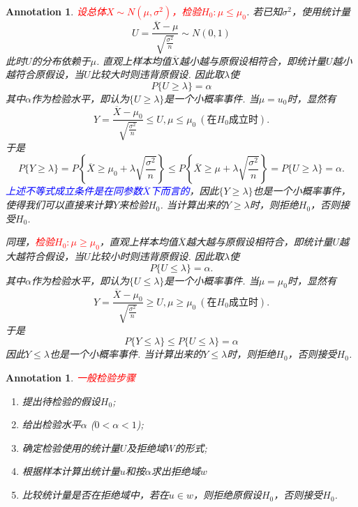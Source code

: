 \documentclass{article}
\newtheorem{annotation}[theorem]{Annotation}
\newcommand{\redt}[1]{\textcolor{red}{#1}}
\newcommand{\bluet}[1]{\textcolor{blue}{#1}}
\begin{document}
\begin{annotation}
\rm \redt{设总体$X \sim N(\mu,\sigma^2)$，检验$H_0: \mu \leq \mu_0$}. 若已知$\sigma^2$，使用统计量
$$
U = \frac{\overline{X}-\mu}{\sqrt{\frac{\sigma^2}{n}}} \sim N(0,1)
$$
此时$U$的分布依赖于$\mu$. 直观上样本均值$\overline{X}$越小越与原假设相符合，即统计量$U$越小越符合原假设，当$U$比较大时则违背原假设. 因此取$\lambda$使
$$
P\{U \geq \lambda\} = \alpha
$$
其中$\alpha$作为检验水平，即认为$\{U \geq \lambda\}$是一个小概率事件. 当$\mu = u_0$时，显然有
$$
Y = \frac{\overline{X}-\mu_0}{\sqrt{\frac{\sigma^2}{n}}} \leq U, \mu \leq \mu_0 ~(\text{在$H_0$成立时}).
$$
于是
$$
P\{Y \geq \lambda \} = P\left\{\overline{X} \geq \mu_0 + \lambda\sqrt{\frac{\sigma^2}{n}}\right\} \leq P\left\{ \overline{X} \geq \mu + \lambda\sqrt{\frac{\sigma^2}{n}} \right\} = P\{U \geq \lambda\} = \alpha.
$$ 
\bluet{上述不等式成立条件是在同参数$\overline{X}$下而言的}，因此$\{Y \geq \lambda\}$也是一个小概率事件，使得我们可以直接来计算$Y$来检验$H_0$. 当计算出来的$Y \geq \lambda$时，则拒绝$H_0$，否则接受$H_0$. 

同理，\redt{检验$H_0: \mu \geq \mu_0$}，直观上样本均值$\overline{X}$越大越与原假设相符合，即统计量$U$越大越符合假设，当$U$比较小时则违背原假设. 因此取$\lambda$使
$$
P\{U \leq \lambda \} = \alpha.
$$
其中$\alpha$作为检验水平，即认为$\{U \leq \lambda\}$是一个小概率事件. 当$\mu=\mu_0$时，显然有
$$
Y = \frac{\overline{X}-\mu_0}{\sqrt{\frac{\sigma^2}{n}}} \geq U , \mu \geq \mu_0  ~(\text{在$H_0$成立时}).
$$
于是
$$
P\{Y \leq \lambda \} \leq P\{U \leq \lambda\} = \alpha
$$
因此${Y \leq \lambda}$也是一个小概率事件. 当计算出来的$Y \leq \lambda$时，则拒绝$H_0$，否则接受$H_0$.
\end{annotation}

\begin{annotation}
\rm \redt{一般检验步骤}
\begin{enumerate}
	\item 提出待检验的假设$H_0$;
	\item 给出检验水平$\alpha$ ($0 < \alpha < 1$);
	\item 确定检验使用的统计量$U$及拒绝域$W$的形式;
	\item 根据样本计算出统计量$u$和按$\alpha$求出拒绝域$w$
	\item 比较统计量是否在拒绝域中，若在$u \in w $，则拒绝原假设$H_0$，否则接受$H_0$.
\end{enumerate}
\end{annotation}
\end{document}
